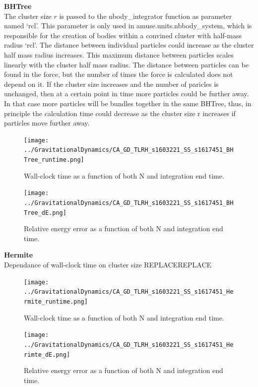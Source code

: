 \documentclass[a4paper]{article}
\begin{document}
\textbf{BHTree} \\
The cluster size $r$ is passed to the nbody\_integrator function as parameter
named `rcl'. This parameter is only used in amuse.units.nbbody\_system, which is
responsible for the creation of bodies within a convined cluster with half-mass
radius `rcl'. The distance between individual particles could increase  as the
cluster half mass radius increases. This maximum distance between particles
scales linearly with the cluster half mass radius. The distance between
particles can be found in the force, but the number of times the force is
calculated does not depend on it. If the cluster size increases and the number
of paricles is unchanged, then at a certain point in time more particles could
be further away. In that case more particles will be bundles together in the
same BHTree, thus, in principle the calculation time could decrease as the
cluster size r increases if particles move further away. 

\begin{figure}[h!]
\begin{center}
\texttt{[image: ../GravitationalDynamics/CA\_GD\_TLRH\_s1603221\_SS\_s1617451\_BHTree\_runtime.png]}
\caption{Wall-clock time as a function of both N and integration end time.}
\label{fig:runtime_BH}
\end{center}
\end{figure}

\begin{figure}[h!]
\begin{center}
\texttt{[image: ../GravitationalDynamics/CA\_GD\_TLRH\_s1603221\_SS\_s1617451\_BHTree\_dE.png]}
\caption{Relative energy error as a function of both N and integration end time.}
\label{fig:dE_BH}
\end{center}
\end{figure}

\textbf{Hermite} \\
Dependance of wall-clock time on cluster size REPLACEREPLACE
\begin{figure}[h!]
\begin{center}
\texttt{[image: ../GravitationalDynamics/CA\_GD\_TLRH\_s1603221\_SS\_s1617451\_Hermite\_runtime.png]}
\caption{Wall-clock time as a function of both N and integration end time.}
\label{fig:runtime_Herm}
\end{center}
\end{figure}

\begin{figure}[h!]
\begin{center}
\texttt{[image: ../GravitationalDynamics/CA\_GD\_TLRH\_s1603221\_SS\_s1617451\_Herimte\_dE.png]}
\caption{Relative energy error as a function of both N and integration end time.}
\label{fig:dE_Herm}
\end{center}
\end{figure}
\end{document}
